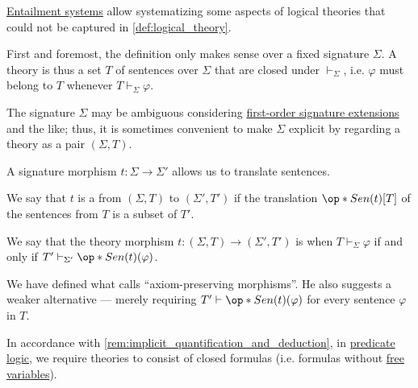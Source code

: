 \begin{definition}\label{def:entailment_system_theory}\mimprovised
  \hyperref[def:entailment_system]{Entailment systems} allow systematizing some aspects of logical theories that could not be captured in \cref{def:logical_theory}.

  First and foremost, the definition only makes sense over a fixed signature \( \Sigma \). A theory is thus a set \( T \) of sentences over \( \Sigma \) that are closed under \( {\vdash_\Sigma} \), i.e. \( \varphi \) must belong to \( T \) whenever \( T \vdash_\Sigma \varphi \).

  The signature  \( \Sigma \) may be ambiguous considering \hyperref[def:fol_signature_extension]{first-order signature extensions} and the like; thus, it is sometimes convenient to make \( \Sigma \) explicit by regarding a theory as a pair \( (\Sigma, T) \).

  \begin{thmenum}
     A signature morphism \( t: \Sigma \to \Sigma' \) allows us to translate sentences.

    We say that \( t \) is a  from \( (\Sigma, T) \) to \( (\Sigma', T') \) if the translation \( \op*{Sen}(t)[T] \) of the sentences from \( T \) is a subset of \( T' \).

     We say that the theory morphism \( t: (\Sigma, T) \to (\Sigma', T') \) is  when \( T \vdash_\Sigma \varphi \) if and only if \( T' \vdash_{\Sigma'} \op*{Sen}(t)(\varphi) \).
  \end{thmenum}
\end{definition}
\begin{comments}
  \item We have defined what \cite[def. 2]{Meseguer1989GeneralLogics} calls \enquote{axiom-preserving morphisms}. He also suggests a weaker alternative --- merely requiring \( T' \vdash \op*{Sen}(t)(\varphi) \) for every sentence \( \varphi \) in \( T \).

  \item In accordance with \cref{rem:implicit_quantification_and_deduction}, in \hyperref[con:predicate_logic]{predicate logic}, we require theories to consist of closed formulas (i.e. formulas without \hyperref[con:variable_binding]{free variables}).
\end{comments}

